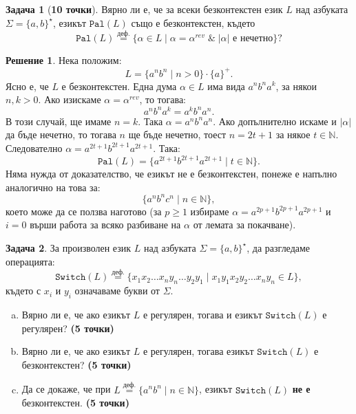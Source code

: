\documentclass[12pt]{article}
\newcommand{\N}{\mathbb{N}}
\newcommand{\logand}{\; \& \;}
\newcommand{\df}{\stackrel{\text{деф.}}{=}}
\theoremstyle{definition}
\newtheorem{problem}{Задача}
\newtheorem*{solution}{Решение}
\begin{document}
\newpage

\begin{problem}[{\bf 10 точки}]
  Вярно ли е, че за всеки безконтекстен език $L$ над азбуката $\Sigma = \{ a, b \}^\star$, езикът $\texttt{Pal}(L)$ също е безконтекстен, където
  \[
    \texttt{Pal}(L) \df \{ \alpha \in L \mid \alpha = \alpha^{rev} \logand |\alpha| \text{ е нечетно}\}?
  \]
\end{problem}

\begin{solution}
  Нека положим:
  \[
    L = \{ a^n b^n \mid n > 0 \} \cdot \{ a \}^+.
  \]
  Ясно е, че $L$ е безконтекстен.
  Една дума $\alpha \in L$ има вида $a^n b^n a^k$, за някои $n, k > 0$.
  Ако изискаме $\alpha = \alpha^{rev}$, то тогава:
  \[
    a^n b^n a^k = a^k b^n a^n.
  \]
  В този случай, ще имаме $n = k$.
  Така $\alpha = a^n b^n a^n$.
  Ако допълнително искаме и $|\alpha|$ да бъде нечетно, то тогава $n$ ще бъде нечетно, тоест $n = 2t + 1$ за някое $t \in \N$.
  Следователно $\alpha = a^{2t + 1} b^{2t + 1} a^{2t + 1}$.
  Така:
  \[
    \texttt{Pal}(L) = \{ a^{2t + 1} b^{2t + 1} a^{2t + 1} \mid t \in \N \}.
  \]
  Няма нужда от доказателство, че езикът не е безконтекстен, понеже е напълно аналогично на това за:
  \[
    \{ a^n b^n c^n \mid n \in \N \},
  \]
  което може да се ползва наготово (за $p \geq 1$ избираме $\alpha = a^{2p + 1} b^{2p + 1} a^{2p + 1}$ и $i = 0$ върши работа за всяко разбиване на $\alpha$ от лемата за покачване).
\end{solution}

\newpage

\begin{problem}
  За произволен език $L$ над азбуката $\Sigma = \{a,b\}^\star$, да разгледаме операцията:
  \[
    \texttt{Switch}(L) \df \{ x_1 x_2 \dots x_n y_n \dots y_2 y_1 \mid x_1 y_1 x_2 y_2 \dots x_n y_n \in L \},
  \]
  където с $x_i$ и $y_i$ означаваме букви от $\Sigma$.
  \begin{enumerate}[(a)]
    \item Вярно ли е, че ако езикът $L$ е регулярен, тогава и езикът $\texttt{Switch}(L)$ е регулярен? {\bf (5 точки)}
    \item Вярно ли е, че ако езикът $L$ е регулярен, тогава езикът $\texttt{Switch}(L)$ е безконтекстен? {\bf (5 точки)}
    \item Да се докаже, че при $L \df \{ a^n b^n \mid n \in \N \}$, езикът $\texttt{Switch}(L)$ {\bf не е} безконтекстен. {\bf (5 точки)}
  \end{enumerate}
\end{problem}
\end{document}
